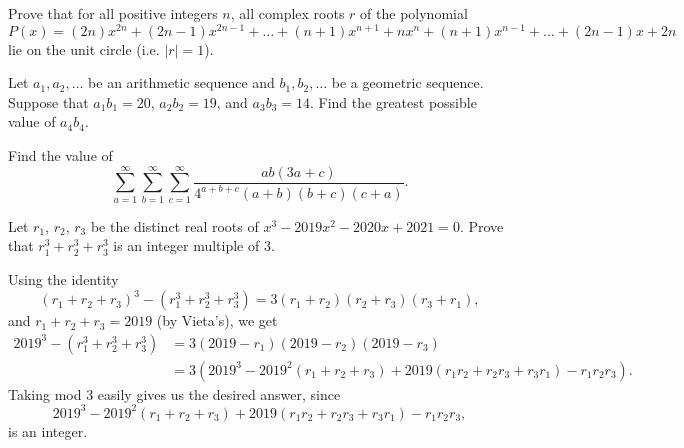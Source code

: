 \documentclass[11pt]{article}
\theoremstyle{definition}
\begin{document}
\begin{question}[name={2019 HMMT, Team, \href{https://artofproblemsolving.com/community/c129h1786137p11795011}{Problem 10}}]
	Prove that for all positive integers $n$, all complex roots $r$ of the polynomial
	\[P(x) = (2n)x^{2n} + (2n-1)x^{2n-1} + \dots + (n+1)x^{n+1} + nx^n + (n+1)x^{n-1} + \dots + (2n-1)x + 2n\]lie on the unit circle (i.e. $|r| = 1$).
\end{question}





\begin{question}[name={2019 HMMT, Algebra \& Number Theory, \href{https://artofproblemsolving.com/community/c129h1786247p11795750}{Problem 5}}]
	Let $a_1, a_2, \dots$ be an arithmetic sequence and $b_1, b_2, \dots$ be a geometric sequence. Suppose that $a_1 b_1 = 20$, $a_2 b_2 = 19$, and $a_3 b_3 = 14$. Find the greatest possible value of $a_4 b_4$.	
\end{question}





\begin{question}[name={2019 HMMT, Algebra \& Number Theory, \href{https://artofproblemsolving.com/community/c129h1786252p11795767}{Problem 7}}]
	Find the value of
	\[\sum_{a = 1}^{\infty} \sum_{b = 1}^{\infty} \sum_{c = 1}^{\infty} \frac{ab(3a + c)}{4^{a+b+c} (a+b)(b+c)(c+a)}.\]
\end{question}



\begin{question}[name={2018-2019 San Diego Power Contest, Winter, \href{https://artofproblemsolving.com/community/c6h2055902p14630262}{Problem 1}}]
	Let $r_1$, $r_2$, $r_3$ be the distinct real roots of $x^3-2019x^2-2020x+2021=0$. Prove that $r_1^3+r_2^3+r_3^3$ is an integer multiple of $3$.
\end{question}

\begin{solution}[name={Solution by freeman66}]
	Using the identity
	$$(r_1+r_2+r_3)^3 - (r^3_1 + r^3_2 + r^3_3) = 3(r_1+r_2)(r_2+r_3)(r_3+r_1),$$and $r_1+r_2+r_3=2019$ (by Vieta's), we get
	\begin{align*}
		2019^3 - (r^3_1 + r^3_2 + r^3_3) &= 3(2019-r_1)(2019-r_2)(2019-r_3) \\
		&= 3(2019^3 - 2019^2 (r_1+r_2+r_3) + 2019 (r_1r_2+r_2r_3+r_3r_1) - r_1r_2r_3).
	\end{align*}
	Taking mod 3 easily gives us the desired answer, since $$2019^3 - 2019^2 (r_1+r_2+r_3) + 2019 (r_1r_2+r_2r_3+r_3r_1) - r_1r_2r_3,$$ is an integer.
\end{solution}
\end{document}
